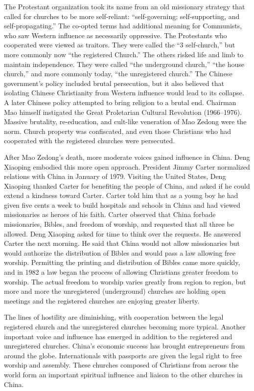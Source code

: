 The Protestant organization took its name from an old missionary strategy that called for churches
to be more self-reliant: “self-governing; self-supporting, and self-propagating.” The co-opted terms
had additional meaning for Communists, who saw Western influence as necessarily oppressive. The
Protestants who cooperated were viewed as traitors. They were called the “3 self-church,” but more
commonly now “the registered Church.” The others risked life and limb to maintain independence. They
were called “the underground church,” “the house church,” and more commonly today, “the unregistered
church.” The Chinese government’s policy included brutal persecution, but it also believed that
isolating Chinese Christianity from Western influence would lead to its collapse. A later Chinese
policy attempted to bring religion to a brutal end. Chairman Mao himself instigated the Great
Proletarian Cultural Revolution (1966–1976). Massive brutality, re-education, and cult-like
veneration of Mao Zedong were the norm. Church property was confiscated, and even those Christians
who had cooperated with the registered churches were persecuted.

After Mao Zedong’s death, more moderate voices gained influence in China. Deng Xiaoping embodied
this more open approach. President Jimmy Carter normalized relations with China in January of 1979.
Visiting the United States, Deng Xiaoping thanked Carter for benefiting the people of China, and
asked if he could extend a kindness toward Carter. Carter told him that as a young boy he had given
five cents a week to build hospitals and schools in China and had viewed missionaries as heroes of
his faith. Carter observed that China forbade missionaries, Bibles, and freedom of worship, and
requested that all three be allowed. Deng Xiaoping asked for time to think over the requests. He
answered Carter the next morning. He said that China would not allow missionaries but would
authorize the distribution of Bibles and would pass a law allowing free worship. Permitting the
printing and distribution of Bibles came more quickly, and in 1982 a law began the process of
allowing Christians greater freedom to worship. The actual freedom to worship varies greatly from
region to region, but more and more the unregistered (underground) churches are holding open
meetings and the registered churches are enjoying greater liberty.

The lines of hostility are diminishing, with cooperation between the legal registered church and the
unregistered churches becoming more typical. Another important voice and influence has emerged in
addition to the registered and unregistered churches. China’s economic success has brought
entrepreneurs from around the globe. Internationals with passports are given the legal right to free
worship and assembly. These churches composed of Christians from across the world form an important
spiritual influence and liaison to the other churches in China.

